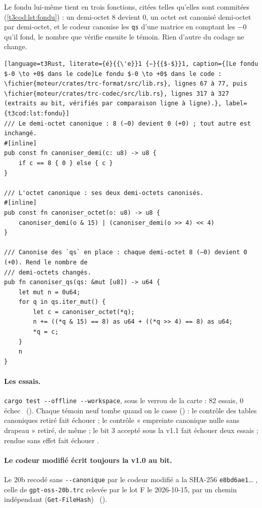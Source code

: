 Le fondu lui-même tient en trois fonctions, citées telles qu'elles sont commitées (\cref{t3cod:lst:fondu}) : un demi-octet 8 devient 0, un octet est canonisé demi-octet par demi-octet, et le codeur canonise les \texttt{qs} d'une matrice en comptant les $-0$ qu'il fond, le nombre que vérifie ensuite le témoin. Rien d'autre du codage ne change.

\begin{lstlisting}[language=t3Rust, literate={é}{{\'e}}1 {−}{{$-$}}1, caption={[Le fondu $-0 \to +0$ dans le code]Le fondu $-0 \to +0$ dans le code : \fichier{moteur/crates/trc-format/src/lib.rs}, lignes 67 à 77, puis \fichier{moteur/crates/trc-codec/src/lib.rs}, lignes 317 à 327 (extraits au bit, vérifiés par comparaison ligne à ligne).}, label={t3cod:lst:fondu}]
/// Le demi-octet canonique : 8 (−0) devient 0 (+0) ; tout autre est inchangé.
#[inline]
pub const fn canoniser_demi(c: u8) -> u8 {
    if c == 8 { 0 } else { c }
}

/// L'octet canonique : ses deux demi-octets canonisés.
#[inline]
pub const fn canoniser_octet(o: u8) -> u8 {
    canoniser_demi(o & 15) | (canoniser_demi(o >> 4) << 4)
}

/// Canonise des `qs` en place : chaque demi-octet 8 (−0) devient 0 (+0). Rend le nombre de
/// demi-octets changés.
pub fn canoniser_qs(qs: &mut [u8]) -> u64 {
    let mut n = 0u64;
    for q in qs.iter_mut() {
        let c = canoniser_octet(*q);
        n += ((*q & 15) == 8) as u64 + ((*q >> 4) == 8) as u64;
        *q = c;
    }
    n
}
\end{lstlisting}

\paragraph{Les essais.} \texttt{cargo test -{}-offline -{}-workspace}, sous le verrou de la carte : 82 essais, 0 échec \mes~(). Chaque témoin neuf tombe quand on le casse () : le contrôle des tables canoniques retiré fait échouer  ; le contrôle « empreinte canonique nulle sans drapeau » retiré, de même ; le bit 3 accepté sous la v1.1 fait échouer deux essais ;  rendue sans effet fait échouer .

\paragraph{Le codeur modifié écrit toujours la v1.0 au bit.} Le 20b recodé sans \texttt{-{}-canonique} par le codeur modifié a la SHA-256 \texttt{e8bd6ae1}\dots{} \parencite{fips180-4}, celle de \texttt{gpt-oss-20b.trc} relevée par le lot F le 2026-10-15, par un chemin indépendant (\texttt{Get-FileHash}) \mes~().

